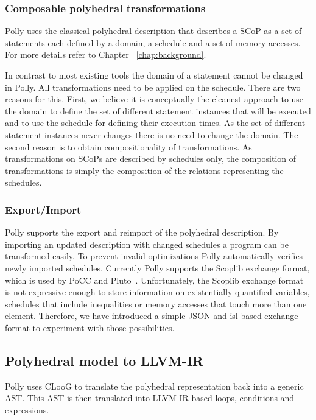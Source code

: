 \subsubsection{Composable polyhedral transformations}
Polly uses the classical polyhedral description \cite{girbal}
that describes a SCoP as a
set of statements each defined by a domain, a schedule and a set of memory
accesses. For more details refer to Chapter ~\ref{chap:background}.

In contrast to most existing tools the domain of a statement cannot be changed
in Polly. All transformations need to be applied on the schedule. There
are two reasons for this. First, we believe it is
conceptually the cleanest approach to use the domain to define the set of
different statement instances that will be executed and to use the schedule for
defining their execution times. As the set of different statement instances
never changes there is no need to change the domain. The second reason is to
obtain compositionality of transformations. As transformations on SCoPs are
described by schedules only, the composition of transformations is simply the
composition of the relations representing the schedules.


\subsubsection{Export/Import}

Polly supports the export and reimport of the polyhedral description.  By
importing an updated description with changed schedules a program can be
transformed easily. To prevent invalid optimizations Polly automatically verifies
newly imported schedules. 
Currently Polly supports the Scoplib exchange format, which is used by
PoCC and Pluto~\cite{pluto}.
Unfortunately, the Scoplib exchange format is not expressive enough to store
information on existentially quantified variables, schedules that include
inequalities or memory accesses that touch more than one element. Therefore, we
have introduced a simple JSON\cite{rfc4627} and isl based exchange format to
experiment with those possibilities.

\subsection{Polyhedral model to LLVM-IR}
Polly uses CLooG \cite{cloog} to translate the polyhedral representation back
into a generic AST. This AST is then
translated into LLVM-IR based loops, conditions and expressions.


